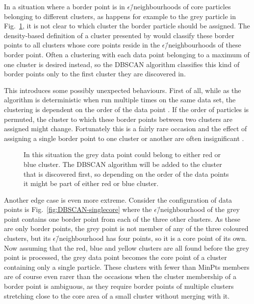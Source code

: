 \documentclass[english, oneside]{HYgradu}
\begin{document}
In a situation where a border point is in $\epsilon$\=/neighbourhoods of core particles belonging to different clusters, as happens for example to the grey particle in Fig.\ \ref{fig:DBSCAN-ambiquity}, it is not clear to which cluster the border particle should be assigned. The density-based definition of a cluster presented by \citet{ester1996density} would classify these border points to all clusters whose core points reside in the $\epsilon$\=/neighbourhoods of these border point. Often a clustering with each data point belonging to a maximum of one cluster is desired instead, so the DBSCAN algorithm classifies this kind of border points only to the first cluster they are discovered in. 

This introduces some possibly unexpected behaviours. First of all, while as the algorithm is deterministic when run multiple times on the same data set, the clustering is dependent on the order of the data point \citep{schubert2017dbscan}. If the order of particles is permuted, the cluster to which these border points between two clusters are assigned might change. Fortunately this is a fairly rare occasion and the effect of assigning a single border point to one cluster or another are often insignificant \citep{schubert2017dbscan}.

\begin{figure}
    \centering
    
    \caption{In this situation the grey data point could belong to either red or blue cluster. The DBSCAN algorithm will be added to the cluster that is discovered first, so depending on the order of the data points it might be part of either red or blue cluster.}\label{fig:DBSCAN-ambiquity}
\end{figure}

Another edge case is even more extreme. Consider the configuration of data points is Fig.\ \ref{fig:DBSCAN-singlecore} where the $\epsilon$\=/neighbourhood of the grey point contains one border point from each of the three other clusters. As these are only border points, the grey point is not member of any of the three coloured clusters, but its $\epsilon$\=/neighbourhood has four points, so it is a core point of its own. Now assuming that the red, blue and yellow clusters are all found before the grey point is processed, the grey data point becomes the core point of a cluster containing only a single particle. These clusters with fewer than MinPts members are of course even rarer than the occasions when the cluster membership of a border point is ambiguous, as they require border points of multiple clusters stretching close to the core area of a small cluster without merging with it.
\end{document}
